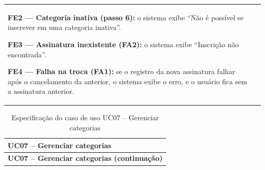 \documentclass[12pt,a4paper]{article}
\begin{document}
\begin{longtable}{|p{}|p{}|}
\par\smallskip\noindent \textbf{FE2 — Categoria inativa (passo 6):} o sistema exibe ``Não é possível se inscrever em uma categoria inativa''.
\par\smallskip\noindent \textbf{FE3 — Assinatura inexistente (FA2):} o sistema exibe ``Inscrição não encontrada''.
\par\smallskip\noindent \textbf{FE4 — Falha na troca (FA1):} se o registro da nova assinatura falhar após o cancelamento da anterior, o sistema exibe o erro, e o usuário fica sem a assinatura anterior. \\
\end{longtable}

\begin{longtable}{|p{}|p{}|}
\caption{Especificação do caso de uso UC07 -- Gerenciar categorias}
\label{tab:uc07} \\
\hline
\multicolumn{2}{|l|}{\textbf{UC07 -- Gerenciar categorias}} \\
\hline
\endfirsthead

\hline
\multicolumn{2}{|l|}{\textbf{UC07 -- Gerenciar categorias (continuação)}} \\
\hline
\endhead


\end{longtable}
\end{document}
